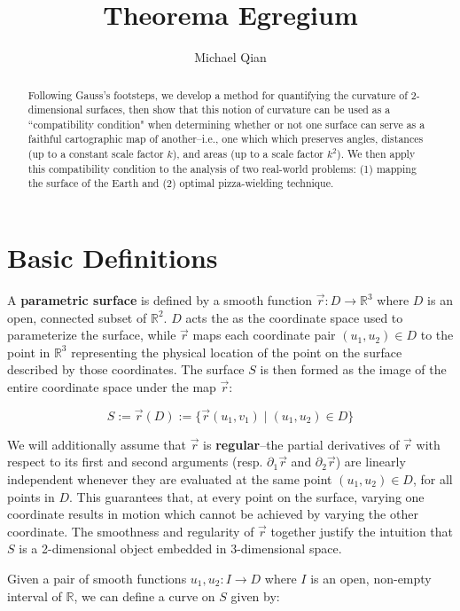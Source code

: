 \documentclass{article}
\title{Theorema Egregium}
\author{Michael Qian}
\begin{document}
\maketitle

\begin{abstract}
  Following Gauss's footsteps, we develop a method for quantifying the curvature of 2-dimensional surfaces, then show that this notion of curvature can be used as a ``compatibility condition" when determining whether or not one surface can serve as a faithful cartographic map of another--i.e., one which which preserves angles, distances (up to a constant scale factor $k$), and areas (up to a scale factor $k^2$). We then apply this compatibility condition to the analysis of two real-world problems: (1) mapping the surface of the Earth and (2) optimal pizza-wielding technique.
\end{abstract}

\section{Basic Definitions}

A \textbf{parametric surface} is defined by a smooth function $\vec{r} : D \to \mathbb{R}^3$ where $D$ is an open, connected subset of $\mathbb{R}^2$. $D$ acts the as the coordinate space used to parameterize the surface, while $\vec{r}$ maps each coordinate pair $(u_1, u_2) \in D$ to the point in $\mathbb{R}^3$ representing the physical location of the point on the surface described by those coordinates. The surface $S$ is then formed as the image of the entire coordinate space under the map $\vec{r}$:

\begin{equation*}
  S := \vec{r}(D) := \{\vec{r}(u_1, v_1) \mid (u_1, u_2) \in D\}
\end{equation*}

We will additionally assume that $\vec{r}$ is \textbf{regular}--the partial derivatives of $\vec{r}$ with respect to its first and second arguments (resp. $\partial_1 \vec{r}$ and $\partial_2 \vec{r}$) are linearly independent whenever they are evaluated at the same point $(u_1, u_2) \in D$, for all points in $D$. This guarantees that, at every point on the surface, varying one coordinate results in motion which cannot be achieved by varying the other coordinate. The smoothness and regularity of $\vec{r}$ together justify the intuition that $S$ is a 2-dimensional object embedded in 3-dimensional space.

Given a pair of smooth functions $u_1, u_2 : I \to D$ where $I$ is an open, non-empty interval of $\mathbb{R}$, we can define a curve on $S$ given by:
\end{document}
